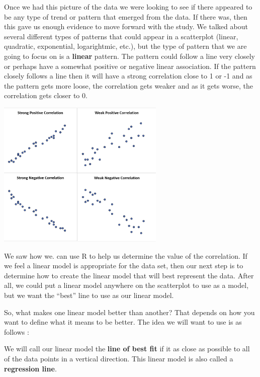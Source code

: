 \documentclass[
  letterpaper,
  DIV=11,
  numbers=noendperiod]{scrreprt}
\begin{document}
Once we had this picture of the data we were looking to see if there
appeared to be any type of trend or pattern that emerged from the data.
If there was, then this gave us enough evidence to move forward with the
study. We talked about several different types of patterns that could
appear in a scatterplot (linear, quadratic, exponential, logarightmic,
etc.), but the type of pattern that we are going to focus on is a
\textbf{linear} pattern. The pattern could follow a line very closely or
perhaps have a somewhat positive or negative linear association. If the
pattern closely follows a line then it will have a strong correlation
close to 1 or -1 and as the pattern gets more loose, the correlation
gets weaker and as it gets worse, the correlation gets closer to 0.

\includegraphics[width=0.6\textwidth,height=\textheight]{./images/LMR_1.jpg}

We saw how we. can use R to help us determine the value of the
correlation. If we feel a linear model is appropriate for the data set,
then our next step is to determine how to create the linear model that
will best represent the data. After all, we could put a linear model
anywhere on the scatterplot to use as a model, but we want the ``best''
line to use as our linear model.

So, what makes one linear model better than another? That depends on how
you want to define what it means to be better. The idea we will want to
use is as follows :

\begin{tcolorbox}[enhanced jigsaw, colbacktitle=quarto-callout-tip-color!10!white, colframe=quarto-callout-tip-color-frame, opacitybacktitle=0.6, rightrule=.15mm, title=\textcolor{quarto-callout-tip-color}{\faLightbulb}\hspace{0.5em}{Line Of Best Fit}, colback=white, coltitle=black, breakable, leftrule=.75mm, toptitle=1mm, bottomrule=.15mm, opacityback=0, bottomtitle=1mm, titlerule=0mm, left=2mm, toprule=.15mm, arc=.35mm]

We will call our linear model the \textbf{line of best fit} if it as
close as possible to all of the data points in a vertical direction.
This linear model is also called a \textbf{regression line}.

\end{tcolorbox}
\end{document}
